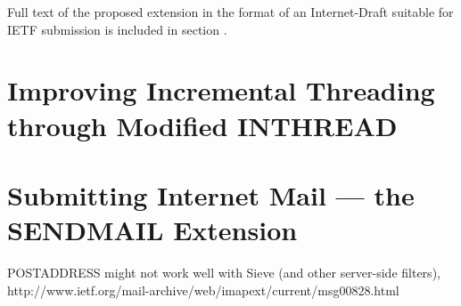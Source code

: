 \documentclass[trojita]{subfiles}
\begin{document}
Full text of the proposed extension in the format of an Internet-Draft suitable for IETF submission is included in
section .

\section{Improving Incremental Threading through Modified INTHREAD}
\label{sec:draft-inthread-ext}

\section{Submitting Internet Mail --- the SENDMAIL Extension}
\label{sec:draft-sendmail}

POSTADDRESS might not work well with Sieve (and other server-side filters),
http://www.ietf.org/mail-archive/web/imapext/current/msg00828.html
\end{document}
